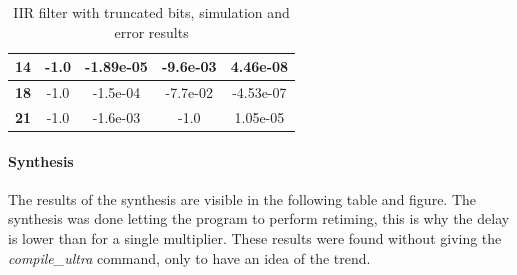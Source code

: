 \documentclass[a4paper]{article}
\begin{document}
\begin{table}[hbtp]
\begin{tabular}{|c|c|c|c|c|}
		\textbf{14}                                                                                    & -1.0                                                                            & -1.89e-05                                                                        & -9.6e-03                                                                       & 4.46e-08                                                                        \\ \hline
		\textbf{18}                                                                                    & -1.0                                                                            & -1.5e-04                                                                         & -7.7e-02                                                                       & -4.53e-07                                                                       \\ \hline
		\textbf{21}                                                                                    & -1.0                                                                            & -1.6e-03                                                                         & -1.0                                                                           & 1.05e-05                                                                        \\ \hline
		\end{tabular}
		\caption{IIR filter with truncated bits, simulation and error results}
		\label{tab:iir_trunc_sim}
	\end{table}


	\paragraph*{Synthesis} The results of the synthesis are visible in the following table and figure. The synthesis was done letting the program to perform retiming, this is why the delay is lower than for a single multiplier. These results were found without giving the \textit{compile\_ultra} command, only to have an idea of the trend.
\end{document}
